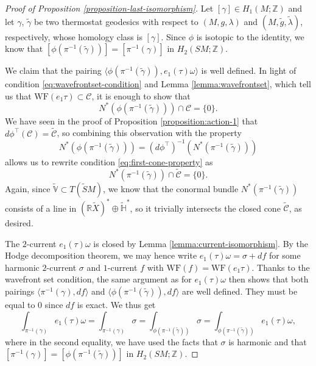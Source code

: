 \documentclass[reqno,12pt,letterpaper]{amsart}
\theoremstyle{definition}
\theoremstyle{remark}
\theoremstyle{definition}
\numberwithin{equation}{section}
\newcommand{\R}{\mathbb{R}}
\newcommand{\Z}{\mathbb{Z}}
\begin{document}
\begin{proof}[Proof of Proposition \ref{proposition-last-isomorphism}]
Let $[\gamma]\in H_1(M; \Z)$ and let $\gamma$, $\tilde{\gamma}$ be two thermostat geodesics with respect to $(M, g, \lambda)$ and $(M, \tilde{g}, \tilde{\lambda})$, respectively, whose homology class is $[\gamma]$. Since $\phi$ is isotopic to the identity, we know that $[\phi(\pi^{-1}(\tilde{\gamma}))]=[\pi^{-1}(\gamma)]$ in $H_2(SM; \Z)$. 

We claim that the pairing $\langle \phi(\pi^{-1}(\tilde{\gamma})), e_1(\tau)\omega\rangle$ is well defined. In light of condition \eqref{eq:wavefrontset-condition} and Lemma \ref{lemma:wavefrontset}, which tell us that $\text{WF}(e_1\tau)\subset \mathcal{C}$, it is enough to show that
\begin{equation}\label{eq:first-cone-property}
N^*(\phi(\pi^{-1}(\tilde{\gamma})))\cap \mathcal{C}=\{0\}.
\end{equation}
We have seen in the proof of Proposition \ref{proposition:action-1} that $d\phi^\top(\mathcal{C})=\widetilde{\mathcal{C}}$, so combining this observation with the property
$$N^*(\phi(\pi^{-1}(\tilde{\gamma})))=(d\phi^{\top})^{-1}(N^*(\pi^{-1}(\tilde{\gamma})))$$
allows us to rewrite condition \eqref{eq:first-cone-property} as
\begin{equation*}
N^*(\pi^{-1}(\tilde{\gamma}))\cap \widetilde{\mathcal{C}}=\{0\}.
\end{equation*}
Again, since $\widetilde{\mathbb{V}}\subset T(\widetilde{S}M)$, we know that the conormal bundle $N^*(\pi^{-1}(\tilde{\gamma}))$ consists of a line in $(\R \widetilde{X})^*\oplus \widetilde{\mathbb{H}}^*$, so it trivially intersects the closed cone $\widetilde{\mathcal{C}}$, as desired. 

The $2$-current $e_1(\tau)\omega$ is closed by Lemma \ref{lemma:current-isomorphism}. By the Hodge decomposition theorem, we may hence write $e_1(\tau)\omega = \sigma+df$ for some harmonic $2$-current $\sigma$ and $1$-current $f$ with $\text{WF}(f)=\text{WF}(e_1\tau)$. Thanks to the wavefront set condition, the same argument as for $e_1(\tau)\omega$ then shows that both pairings $\langle \pi^{-1}(\gamma), df\rangle$ and $\langle \phi(\pi^{-1}(\tilde{\gamma})), df\rangle$ are well defined. They must be equal to $0$ since $df$ is exact. We thus get
$$\int_{\pi^{-1}(\gamma)}e_1(\tau)\omega = \int_{\pi^{-1}(\gamma)}\sigma =\int_{\phi(\pi^{-1}(\tilde{\gamma}))}\sigma = \int_{\phi(\pi^{-1}(\tilde{\gamma}))}e_1(\tau)\omega,$$
where in the second equality, we have used the facts that $\sigma$ is harmonic and that $[\pi^{-1}(\gamma)]=[\phi(\pi^{-1}(\tilde{\gamma}))]$ in $H_2(SM; \Z)$. 


\end{proof}
\end{document}
